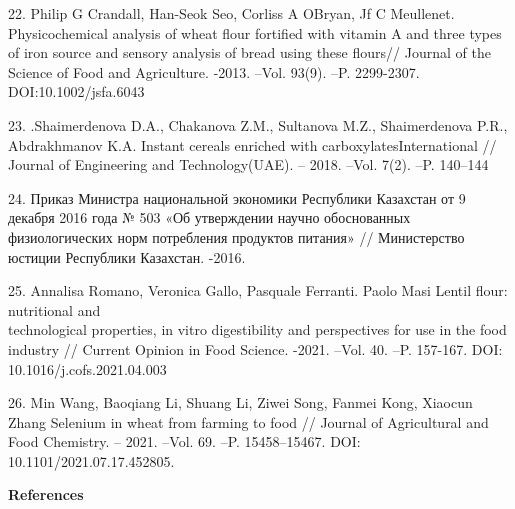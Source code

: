 \begin{noparindent}
22. Philip G Crandall, Han-Seok Seo, Corliss A O\textquotesingle Bryan,
Jf C Meullenet. Physicochemical analysis of wheat flour fortified with
vitamin A and three types of iron source and sensory analysis of bread
using these flours// Journal of the Science of Food and Agriculture.
-2013. --Vol. 93(9). --P. 2299-2307. \\DOI:10.1002/jsfa.6043

23. .Shaimerdenova D.A., Chakanova Z.M., Sultanova M.Z., Shaimerdenova
P.R., Abdrakhmanov K.A. Instant cereals enriched with
carboxylatesInternational // Journal of Engineering and Technology(UAE).
-- 2018. --Vol. 7(2). --P. 140--144

24. Приказ Министра национальной экономики Республики Казахстан от 9
декабря 2016 года № 503 «Об утверждении научно обоснованных
физиологических норм потребления продуктов питания» // Министерство
юстиции Республики Казахстан. -2016.

25. Annalisa Romano, Veronica Gallo, Pasquale Ferranti. Paolo Masi
Lentil flour: nutritional and \\technological properties, in vitro
digestibility and perspectives for use in the food industry // Current
Opinion in Food Science. -2021. --Vol. 40. --P. 157-167. DOI:
10.1016/j.cofs.2021.04.003

26. Min Wang, Baoqiang Li, Shuang Li, Ziwei Song, Fanmei Kong, Xiaocun
Zhang Selenium in wheat from farming to food // Journal of Agricultural
and Food Chemistry. -- 2021. --Vol. 69. --P. 15458--15467. DOI:
10.1101/2021.07.17.452805.

\end{noparindent}

\begin{center}
{\bfseries References}
\end{center}

